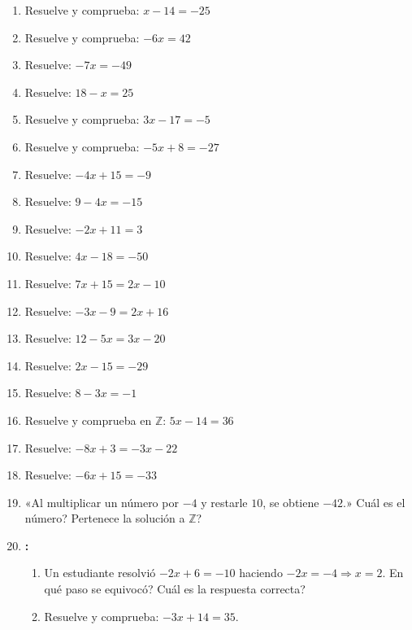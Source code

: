 \documentclass[12pt, letterpaper]{article}
\newcommand{\Z}{\mathbb{Z}}
\begin{document}
\begin{enumerate}[leftmargin=*, start=21]
  \item \facil{} Resuelve y comprueba: $x - 14 = -25$

  \item \facil{} Resuelve y comprueba: $-6x = 42$

  \item \facil{} Resuelve: $-7x = -49$

  \item \facil{} Resuelve: $18 - x = 25$

  \item \medio{} Resuelve y comprueba: $3x - 17 = -5$

  \item \medio{} Resuelve y comprueba: $-5x + 8 = -27$

  \item \medio{} Resuelve: $-4x + 15 = -9$

  \item \medio{} Resuelve: $9 - 4x = -15$

  \item \medio{} Resuelve: $-2x + 11 = 3$

  \item \medio{} Resuelve: $4x - 18 = -50$

  \item \medio{} Resuelve: $7x + 15 = 2x - 10$

  \item \medio{} Resuelve: $-3x - 9 = 2x + 16$

  \item \medio{} Resuelve: $12 - 5x = 3x - 20$

  \item \medio{} Resuelve: $2x - 15 = -29$

  \item \medio{} Resuelve: $8 - 3x = -1$

  \item \dificil{} Resuelve y comprueba en $\Z$: $5x - 14 = 36$

  \item \dificil{} Resuelve: $-8x + 3 = -3x - 22$

  \item \dificil{} Resuelve: $-6x + 15 = -33$

  \item \dificil{} «Al multiplicar un número por $-4$ y restarle $10$, se obtiene $-42$.» \textquestiondown Cuál es el número? \textquestiondown Pertenece la solución a $\Z$?

  \item \dificil{} \textbf{:}
        \begin{enumerate}[label=\alph*)]
          \item Un estudiante resolvió $-2x + 6 = -10$ haciendo $-2x = -4 \Rightarrow x = 2$. \textquestiondown En qué paso se equivocó? \textquestiondown Cuál es la respuesta correcta?
          \item Resuelve y comprueba: $-3x + 14 = 35$.
        \end{enumerate}
\end{enumerate}
\end{document}
